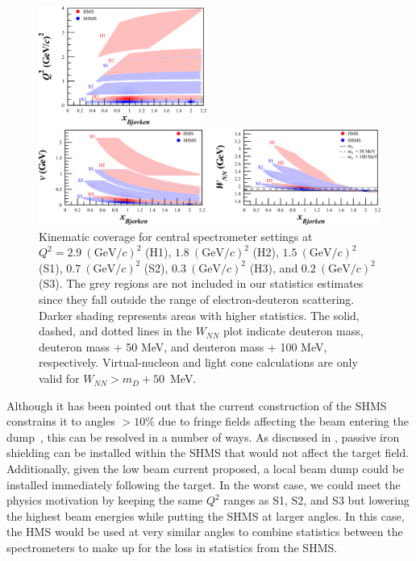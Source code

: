 \begin{figure}
\begin{center}
\includegraphics[width=0.49\textwidth]{figs/Pzz_30_all_q2.eps}

\includegraphics[width=\textwidth]{figs/Pzz_30_all_nu_wnn.eps}

\caption{\label{kincov} Kinematic coverage for central spectrometer settings at $Q^2=2.9~(\mathrm{GeV}/c)^2$ (H1), $1.8~(\mathrm{GeV}/c)^2$ (H2), $1.5~(\mathrm{GeV}/c)^2$ (S1), $0.7~(\mathrm{GeV}/c)^2$ (S2), $0.3~(\mathrm{GeV}/c)^2$ (H3), and $0.2~(\mathrm{GeV}/c)^2$ (S3). The grey regions are not included in our statistics estimates since they fall outside the range of electron-deuteron scattering. Darker shading represents areas with higher statistics. The solid, dashed, and dotted lines in the $W_{NN}$ plot indicate deuteron mass, deuteron mass + 50 MeV, and deuteron mass + 100 MeV, respectively. Virtual-nucleon and light cone calculations are only valid for $W_{NN}>m_D+50$~MeV.}
\end{center}
\end{figure}

Although it has been pointed out that the current construction of the SHMS constrains it to angles $>10\%$ due to fringe fields affecting the beam entering the dump~\cite{Moore:2014sxa}, this can be resolved in a number of ways. As discussed in \cite{Moore:2014sxa}, passive iron shielding can be installed within the SHMS that would not affect the target field. Additionally, given the low beam current proposed, a local beam dump could be installed immediately following the target. In the worst case, we could meet the physics motivation by keeping the same $Q^2$ ranges as S1, S2, and S3 but lowering the highest beam energies while putting the SHMS at larger angles. In this case, the HMS would be used at very similar angles to combine statistics between the spectrometers to make up for the loss in statistics from the SHMS. 


